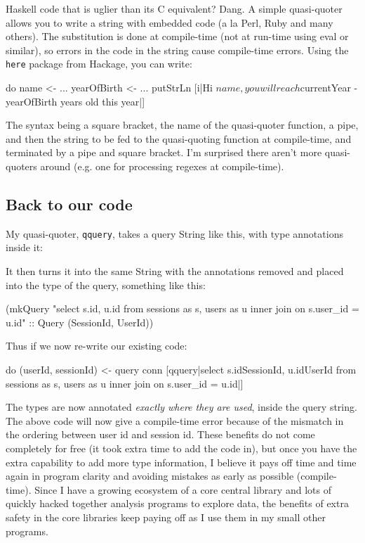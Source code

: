 \documentclass{tmr}
\begin{document}
Haskell code that is uglier than its C equivalent?  Dang.  A simple quasi-quoter allows you to write a string with embedded code (a la Perl, Ruby and many others).  The substitution is done at compile-time (not at run-time using eval or similar), so errors in the code in the string cause compile-time errors.  Using the \texttt{here} package from Hackage, you can write:

\begin{code}
do name <- ...
   yearOfBirth <- ...
   putStrLn [i|Hi ${name}, you will reach ${currentYear - yearOfBirth}
     years old this year|]
\end{code}

The syntax being a square bracket, the name of the quasi-quoter function, a pipe, and then the string to be fed to the quasi-quoting function at compile-time, and terminated by a pipe and square bracket.  I'm surprised there aren't more quasi-quoters around (e.g. one for processing regexes at compile-time).

\subsection{Back to our code}

My quasi-quoter, \lstinline|qquery|, takes a query String like this, with type annotations inside it:

\begin{code}
[qquery|select s.id{SessionId}, u.id{UserId} from sessions as s, users as u
   inner join on s.user_id = u.id|]
\end{code}

It then turns it into the same String with the annotations removed and placed into the type of the query, something like this:

\begin{code}
(mkQuery "select s.id, u.id from sessions as s, users as u inner join
  on s.user_id = u.id" :: Query (SessionId, UserId))
\end{code}

Thus if we now re-write our existing code:

\begin{code}
do (userId, sessionId) <- query conn [qquery|select s.id{SessionId},
     u.id{UserId} from sessions as s, users as u
     inner join on s.user_id = u.id|]
\end{code}

The types are now annotated \textit{exactly where they are used}, inside the query string.  The above code will now give a compile-time error because of the mismatch in the ordering between user id and session id.  These benefits do not come completely for free (it took extra time to add the code in), but once you have the extra capability to add more type information, I believe it pays off time and time again in program clarity and avoiding mistakes as early as possible (compile-time).  Since I have a growing ecosystem of a core central library and lots of quickly hacked together analysis programs to explore data, the benefits of extra safety in the core libraries keep paying off as I use them in my small other programs.
\end{document}
